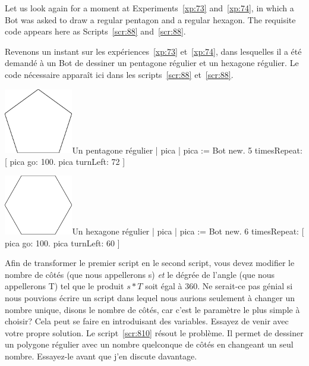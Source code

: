 \documentclass[a4paper,10pt,twoside]{book}
\begin{document}
Let us look again for a moment at Experiments~\ref{xp:73} and~\ref{xp:74}, in which a Bot was asked to 
draw a regular pentagon and a regular hexagon. The requisite code appears here as Scripts~\ref{scr:88}
and~\ref{scr:88}.

Revenons un instant sur les exp\'eriences~\ref{xp:73} et~\ref{xp:74}, dans lesquelles il a \'et\'e demand\'e \`a un Bot de dessiner un pentagone r\'egulier et un hexagone r\'egulier. Le code n\'ecessaire appara\^it ici dans les scripts~\ref{scr:88} et~\ref{scr:88}.

\begin{scriptfigwithsize}[0.4]{\includegraphics[width=3cm]{varFPentagon}}{Un pentagone r\'egulier }\label{scr:88}
| pica | 
pica := Bot new. 
5 timesRepeat: 
	[ pica go: 100. 
	pica turnLeft: 72 ] 
\end{scriptfigwithsize}

\begin{scriptfigwithsize}[0.4]{\includegraphics[width=3cm]{varFHexagon}}{Un hexagone r\'egulier }\label{scr:89}
| pica | 
pica := Bot new. 
6 timesRepeat: 
	[ pica go: 100. 
	pica turnLeft: 60 ]
\end{scriptfigwithsize}

Afin de transformer le premier script en le second script, vous devez modifier le nombre de c\^ot\'es (que nous appellerons s) \emph{et} le d\'egr\'ee de l'angle (que nous appellerons T) tel que le produit $s*T$  soit \'egal \`a 360. Ne serait-ce pas g\'enial si nous pouvions \'ecrire un script dans lequel nous aurions seulement  \`a changer un nombre unique, disons le nombre de c\^ot\'es, car c'est le param\`etre le plus simple \`a choisir? Cela peut se faire en introduisant des variables. Essayez de venir avec votre propre solution. Le script~\ref{scr:810} r\'esout le probl\`eme. Il permet de dessiner un polygone r\'egulier avec un nombre quelconque de c\^ot\'es en changeant un seul nombre. Essayez-le avant que j'en discute davantage. 
\end{document}
